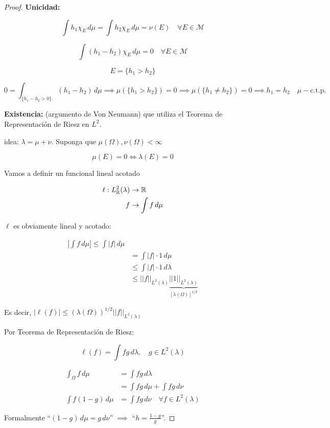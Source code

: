 \begin{proof}
    \textbf{Unicidad:}

    \[\int h_1\chi_E\,d\mu=\int h_2\chi_E\,d\mu=\nu(E)\quad\forall E\in\mathcal{M}\]

    \[\int (h_1-h_2)\chi_E\,d\mu=0\quad\forall E\in\mathcal{M}\]

    \[E=\{h_1>h_2\}\]

    \[0=\int_{\{h_1-h_2>0\}} (h_1-h_2)\,d\mu\implies \mu(\{h_1>h_2\})=0\implies \mu(\{h_1\neq h_2\})=0\implies h_1=h_2\quad\mu-\text{c.t.p.}\]

    \textbf{Existencia:} (argumento de Von Neumann) que utiliza el Teorema de Representación de Riesz en $L^2$. 

    idea: $\lambda=\mu+\nu$. Suponga que $\mu(\Omega),\nu(\Omega)<\infty$

    \[\mu(E)=0\iff \lambda(E)=0\]

    Vamos a definir un funcional lineal acotado 

    \begin{align*}
        \ell:L^2_{\mathbb{R}}(\lambda)&\to\mathbb{R}\\
        f&\to \int f\,d\mu
    \end{align*}

    $\ell$ es obviamente lineal y acotado:

    \begin{align*}
        \left|\int f\,d\mu\right|\leq \int |f|\,d\mu\\
        &=\int |f|\cdot 1\,d\mu\\
        &\leq \int |f|\cdot 1\,d\lambda\\
        &\leq ||f||_{L^2(\lambda)}\underbrace{||1||_{L^2(\lambda)}}_{[\lambda(\Omega)]^{1/2}}
    \end{align*}

    Es decir, $|\ell(f)|\leq (\lambda(\Omega))^{1/2}||f||_{L^2(\lambda)}$

    Por Teorema de Representación de Riesz:

    \[\ell(f)=\int fg\,d\lambda,\quad g\in L^2(\lambda)\]

    \begin{align}
        \int_{\Omega} f\,d\mu&=\int fg\,d\lambda\nonumber\\
        &=\int fg\,d\mu+\int fg\,d\nu\nonumber\\
        \int f(1-g)\,d\mu&=\int fg\,d\nu\quad\forall f\in L^2(\lambda)
    \end{align}

    Formalmente ``$(1-g)\,d\mu=g\,d\nu$'' $\implies$ ``$h=\frac{1-g}{g}$''.


\end{proof}
